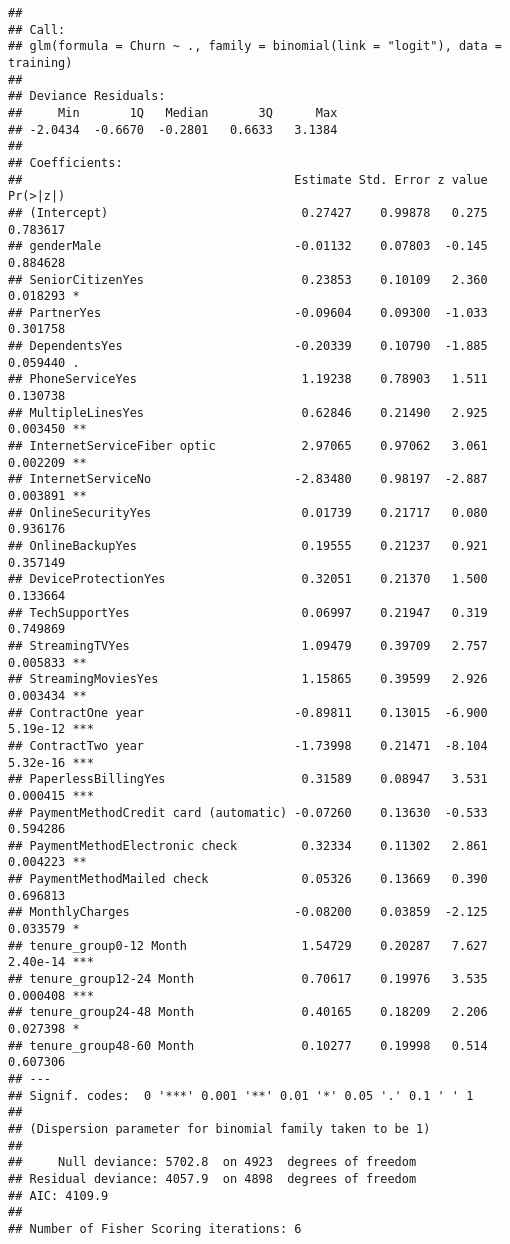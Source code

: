 \documentclass[]{article}
\begin{document}
\begin{verbatim}
## 
## Call:
## glm(formula = Churn ~ ., family = binomial(link = "logit"), data = training)
## 
## Deviance Residuals: 
##     Min       1Q   Median       3Q      Max  
## -2.0434  -0.6670  -0.2801   0.6633   3.1384  
## 
## Coefficients:
##                                      Estimate Std. Error z value Pr(>|z|)    
## (Intercept)                           0.27427    0.99878   0.275 0.783617    
## genderMale                           -0.01132    0.07803  -0.145 0.884628    
## SeniorCitizenYes                      0.23853    0.10109   2.360 0.018293 *  
## PartnerYes                           -0.09604    0.09300  -1.033 0.301758    
## DependentsYes                        -0.20339    0.10790  -1.885 0.059440 .  
## PhoneServiceYes                       1.19238    0.78903   1.511 0.130738    
## MultipleLinesYes                      0.62846    0.21490   2.925 0.003450 ** 
## InternetServiceFiber optic            2.97065    0.97062   3.061 0.002209 ** 
## InternetServiceNo                    -2.83480    0.98197  -2.887 0.003891 ** 
## OnlineSecurityYes                     0.01739    0.21717   0.080 0.936176    
## OnlineBackupYes                       0.19555    0.21237   0.921 0.357149    
## DeviceProtectionYes                   0.32051    0.21370   1.500 0.133664    
## TechSupportYes                        0.06997    0.21947   0.319 0.749869    
## StreamingTVYes                        1.09479    0.39709   2.757 0.005833 ** 
## StreamingMoviesYes                    1.15865    0.39599   2.926 0.003434 ** 
## ContractOne year                     -0.89811    0.13015  -6.900 5.19e-12 ***
## ContractTwo year                     -1.73998    0.21471  -8.104 5.32e-16 ***
## PaperlessBillingYes                   0.31589    0.08947   3.531 0.000415 ***
## PaymentMethodCredit card (automatic) -0.07260    0.13630  -0.533 0.594286    
## PaymentMethodElectronic check         0.32334    0.11302   2.861 0.004223 ** 
## PaymentMethodMailed check             0.05326    0.13669   0.390 0.696813    
## MonthlyCharges                       -0.08200    0.03859  -2.125 0.033579 *  
## tenure_group0-12 Month                1.54729    0.20287   7.627 2.40e-14 ***
## tenure_group12-24 Month               0.70617    0.19976   3.535 0.000408 ***
## tenure_group24-48 Month               0.40165    0.18209   2.206 0.027398 *  
## tenure_group48-60 Month               0.10277    0.19998   0.514 0.607306    
## ---
## Signif. codes:  0 '***' 0.001 '**' 0.01 '*' 0.05 '.' 0.1 ' ' 1
## 
## (Dispersion parameter for binomial family taken to be 1)
## 
##     Null deviance: 5702.8  on 4923  degrees of freedom
## Residual deviance: 4057.9  on 4898  degrees of freedom
## AIC: 4109.9
## 
## Number of Fisher Scoring iterations: 6
\end{verbatim}
\end{document}
